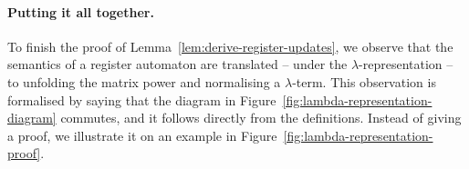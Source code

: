 \label{page:monotone-discussed}


\paragraph*{Putting it all together.} To finish the proof of Lemma~\ref{lem:derive-register-updates}, we   observe  that the semantics of a register automaton are translated -- under the $\lambda$-representation -- to unfolding the matrix power and normalising a $\lambda$-term.  This observation is formalised by saying that the diagram in Figure~\ref{fig:lambda-representation-diagram} commutes, and it  follows directly from the definitions. Instead of giving a proof, we illustrate it on an example in Figure~\ref{fig:lambda-representation-proof}.



